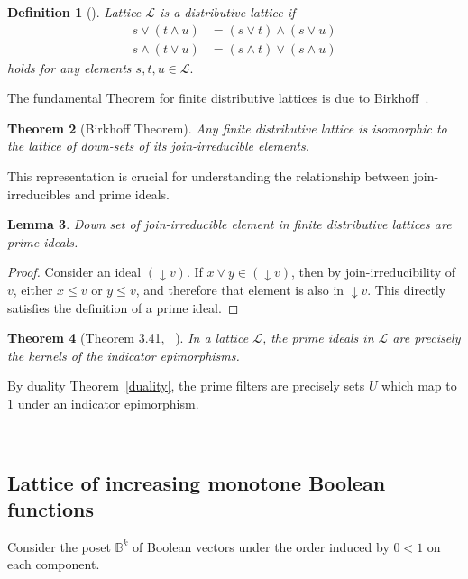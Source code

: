 \documentclass[10pt,letterpaper]{article}
\newcommand{\bbB}{\mathbb{B}}
\newcommand{\cL}{\mathcal{L}}
\newtheorem{thm}{Theorem}[section]
\newtheorem{lem}[thm]{Lemma}
\newtheorem{defn}[thm]{Definition}
\begin{document}
\begin{defn}[\cite{stanley_enumerative_2011}]
Lattice $\cL$ is a \textit{ distributive lattice } if 
\begin{align*}
    s \vee (t\wedge u) &= (s\vee t) \wedge (s\vee u) \\
     s \wedge (t\vee u) &= (s\wedge t) \vee (s\wedge u)
\end{align*}
holds for any elements $s,t,u \in \cL.$
\end{defn}

The fundamental Theorem for finite distributive lattices is due to Birkhoff~\cite{birkhoff_combination_1933}.

\begin{thm}[Birkhoff Theorem] \label{birkhoff}
Any finite distributive lattice is isomorphic to the lattice of down-sets of its join-irreducible elements. 
\end{thm}

This representation is crucial for understanding the relationship between join-irreducibles and prime ideals. 

\begin{lem}\label{lem:prime}
    Down set of join-irreducible element in finite distributive lattices are prime ideals. 
\end{lem}
\begin{proof}
Consider an ideal $(\downarrow v)$.
If $x \vee y \in (\downarrow v)$, then by join-irreducibility of $v$, either $x\leq v$ or $y\leq v$, and therefore that element is also in $\downarrow v$. This directly satisfies the definition of a prime ideal. 
\end{proof}

\begin{thm}[Theorem 3.41, ~\cite{roman_lattices_2008}]
\label{epimorphism}
In a lattice $\cL$, the prime ideals in $\cL$ are precisely the kernels of the indicator epimorphisms.
\end{thm}
By duality Theorem~\ref{duality}, the prime filters are precisely sets $U$ which map to $1$ under an indicator epimorphism.

\

\subsection{Lattice of increasing monotone Boolean functions}

Consider the poset $\bbB^k$ of Boolean vectors under the order induced by $0<1$ on each component.
\end{document}
